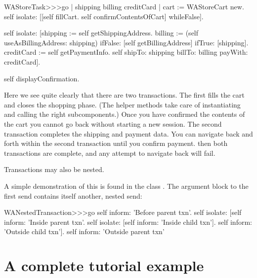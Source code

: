 \documentclass[a4paper,10pt,twoside]{book}
\begin{document}
\begin{code}{}
WAStoreTask>>>go
	| shipping billing creditCard |
	cart := WAStoreCart new.
	self isolate:
		[[self fillCart.
		self confirmContentsOfCart]
			whileFalse].

	self isolate:
		[shipping := self getShippingAddress.
		billing := (self useAsBillingAddress: shipping)
					ifFalse: [self getBillingAddress]
					ifTrue: [shipping].
		creditCard := self getPaymentInfo.
		self shipTo: shipping billTo: billing payWith: creditCard].

	self displayConfirmation.
\end{code}

Here we see quite clearly that there are two transactions.
The first fills the cart and closes the shopping phase.
(The helper methods  \etc take care of instantiating and calling the right subcomponents.)
Once you have confirmed the contents of the cart you cannot go back without starting a new session.
The second transaction completes the shipping and payment data.
You can navigate back and forth within the second transaction until you confirm payment.
then both transactions are complete, and any attempt to navigate back will fail.

Transactions may also be nested.

A simple demonstration of this is found in the class .
The argument block to the first  send contains itself another, nested  send:

\begin{code}{}
WANestedTransaction>>>go
	self inform: 'Before parent txn'.
	self isolate:
			[self inform: 'Inside parent txn'.
			self isolate: [self inform: 'Inside child txn'].
			self inform: 'Outside child txn'].
	self inform: 'Outside parent txn'
\end{code}


\section{A complete tutorial example}
\end{document}
